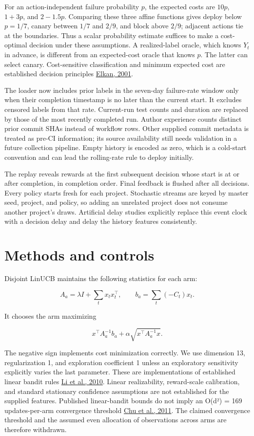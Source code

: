 \documentclass[
  10pt,
]{article}
\begin{document}
For an action-independent failure probability \(p\), the expected costs
are \(10p\), \(1+3p\), and \(2-1.5p\). Comparing these three affine
functions gives deploy below \(p=1/7\), canary between \(1/7\) and
\(2/9\), and block above \(2/9\); adjacent actions tie at the
boundaries. Thus a scalar probability estimate suffices to make a
cost-optimal decision under these assumptions. A realized-label oracle,
which knows \(Y_t\) in advance, is different from an expected-cost
oracle that knows \(p\). The latter can select canary. Cost-sensitive
classification and minimum expected cost are established decision
principles \href{https://cseweb.ucsd.edu/~elkan/rescale.pdf}{Elkan,
2001}.

The loader now includes prior labels in the seven-day failure-rate
window only when their completion timestamp is no later than the current
start. It excludes censored labels from that rate. Current-run test
counts and duration are replaced by those of the most recently completed
run. Author experience counts distinct prior commit SHAs instead of
workflow rows. Other supplied commit metadata is treated as pre-CI
information; its source availability still needs validation in a future
collection pipeline. Empty history is encoded as zero, which is a
cold-start convention and can lead the rolling-rate rule to deploy
initially.

The replay reveals rewards at the first subsequent decision whose start
is at or after completion, in completion order. Final feedback is
flushed after all decisions. Every policy starts fresh for each project.
Stochastic streams are keyed by master seed, project, and policy, so
adding an unrelated project does not consume another project's draws.
Artificial delay studies explicitly replace this event clock with a
decision delay and delay the history features consistently.

\section{Methods and controls}\label{methods-and-controls}

Disjoint LinUCB maintains the following statistics for each arm:

\[A_a=\lambda I+\sum_t {x_t x_t^\top},\qquad b_a=\sum_t {(-C_t)x_t}.\]

It chooses the arm maximizing

\[x^\top A_a^{-1}b_a+\alpha\sqrt{x^\top A_a^{-1}x}.\]

The negative sign implements cost minimization correctly. We use
dimension 13, regularization 1, and exploration coefficient 1 unless an
exploratory sensitivity explicitly varies the last parameter. These are
implementations of established linear bandit rules
\href{https://arxiv.org/abs/1003.0146}{Li et al., 2010}. Linear
realizability, reward-scale calibration, and standard stationary
confidence assumptions are not established for the supplied features.
Published linear-bandit bounds do not imply an O(d²) = 169
updates-per-arm convergence threshold
\href{https://proceedings.mlr.press/v15/chu11a.html}{Chu et al., 2011}.
The claimed convergence threshold and the assumed even allocation of
observations across arms are therefore withdrawn.
\end{document}
